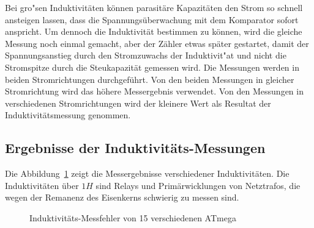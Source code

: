 Bei gro"sen Induktivit\"aten k\"onnen parasit\"are Kapazit\"aten den Strom so schnell ansteigen lassen, dass
die Spannungs\"uberwachung mit dem Komparator sofort anspricht. Um dennoch die Induktivit\"at bestimmen zu
k\"onnen, wird die gleiche Messung noch einmal gemacht, aber der Z\"ahler etwas sp\"ater gestartet, damit
der Spannungsanstieg durch den Stromzuwachs der Induktivit"at und nicht die Stromspitze durch die
Steukapazit\"at gemessen wird.
Die Messungen werden in beiden Stromrichtungen durchgef\"uhrt.
Von den beiden Messungen in gleicher Stromrichtung wird das h\"ohere Messergebnis verwendet.
Von den Messungen in verschiedenen Stromrichtungen wird der kleinere Wert als Resultat der Induktivit\"atsmessung genommen.

\subsection{Ergebnisse der Induktivit\"ats-Messungen}
Die Abbildung~\ref{fig:Induct328p} zeigt die Messergebnisse verschiedener Induktivit\"aten.
Die Induktivit\"aten \"uber \(1 H\) sind Relays und Prim\"arwicklungen von Netztrafos, die wegen
der Remanenz des Eisenkerns schwierig zu messen sind.

\begin{figure}[H]
\centering

\caption{Induktivit\"ats-Messfehler von 15 verschiedenen ATmega}
\label{fig:Induct328p}
\end{figure}
